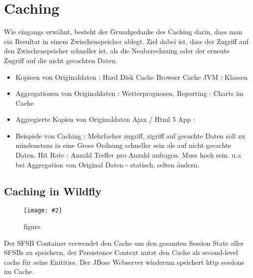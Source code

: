 \documentclass[a4paper,10pt]{scrreprt}
\newcommand{\pic}[2][figure]{\begin{figure}[h]
 \centering
 \texttt{[image: \#2]}
 \caption{#1}
\end{figure}
}
\begin{document}
\chapter{Caching} %
\label{cha:caching}
Wie eingangs erwähnt, besteht der Grundgedanke des Caching darin, dass man ein Resultat in einem
Zwischenspeicher ablegt. Ziel dabei ist, dass der Zugriff auf den Zwischenspeicher schneller ist, als die
Neuberechnung oder der erneute Zugriff auf die nicht gecachten Daten.
\begin{itemize}
	\item Kopieen von Originaldaten : Hard Disk Cache Browser Cache JVM : Klassen
	\item Aggregationen von Originaldaten : Wetterprognosen, Reporting : Charts im Cache
	\item  Aggregierte Kopien von Originaldaten Ajax / Html 5 App : 
	\item Beispiele von Caching : Mehrfacher zugriff, zigriff auf gecachte Daten soll zu mindenstens in eine Gross Ordnung schneller sein als auf nicht gecachte Daten.
	\subitem Hit Rate : Anzahl Treffer pro Anzahl anfragen. Muss hoch sein.
	\subitem u.a bei Aggregation von Original Daten - statisch, selten ändern.
\end{itemize}

\section{Caching in Wildfly} %
\label{sec:caching_in_wildfly}
\pic{cwf.png}
Der SFSB Container verwendet den Cache um den gesamten Session State aller SFSBs zu speichern, der
Persistence Context nutzt den Cache als second-level cache für seine Enitities. Der JBoss Webserver wiederum
speichert http sessions im Cache.
\end{document}

